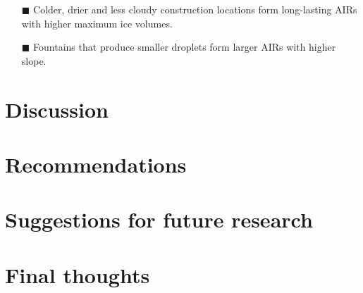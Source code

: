 \begin{itemize} 

\item[\tiny{$\blacksquare$}] Colder, drier and less cloudy construction locations form long-lasting AIRs with
  higher maximum ice volumes. 

\item[\tiny{$\blacksquare$}] Fountains that produce smaller droplets form larger AIRs with higher slope. 

\end{itemize}


\section{Discussion}

\section{Recommendations}

\section{Suggestions for future research}

\section{Final thoughts}
